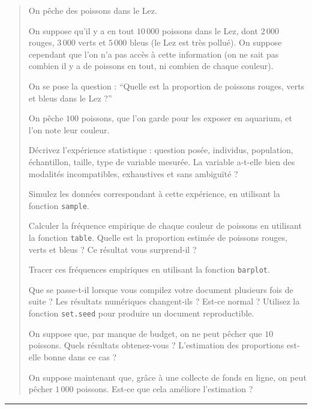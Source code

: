 \documentclass[
]{article}
\begin{document}
\begin{quote}
On pêche des poissons dans le Lez.

On suppose qu'il y a en tout \(10\,000\) poissons dans le Lez, dont
\(2\,000\) rouges, \(3\,000\) verts et \(5\,000\) bleus (le Lez est très
pollué). On suppose cependant que l'on n'a pas accès à cette information
(on ne sait pas combien il y a de poissons en tout, ni combien de chaque
couleur).

On se pose la question : ``Quelle est la proportion de poissons rouges,
verts et bleus dans le Lez ?''

On pêche \(100\) poissons, que l'on garde pour les exposer en aquarium,
et l'on note leur couleur.

Décrivez l'expérience statistique : question posée, individus,
population, échantillon, taille, type de variable mesurée. La variable
a-t-elle bien des modalités incompatibles, exhaustives et sans ambiguïté
?

Simulez les données correspondant à cette expérience, en utilisant la
fonction \texttt{sample}.

Calculer la fréquence empirique de chaque couleur de poissons en
utilisant la fonction \texttt{table}. Quelle est la proportion estimée
de poissons rouges, verts et bleus ? Ce résultat vous surprend-il ?

Tracer ces fréquences empiriques en utilisant la fonction
\texttt{barplot}.

Que se passe-t-il lorsque vous compilez votre document plusieurs fois de
suite ? Les résultats numériques changent-ils ? Est-ce normal ? Utilisez
la fonction \texttt{set.seed} pour produire un document reproductible.

On suppose que, par manque de budget, on ne peut pêcher que \(10\)
poissons. Quels résultats obtenez-vous ? L'estimation des proportions
est-elle bonne dans ce cas ?

On suppose maintenant que, grâce à une collecte de fonds en ligne, on
peut pêcher \(1\,000\) poissons. Est-ce que cela améliore l'estimation ?
\end{quote}

\begin{center}\rule{0.5\linewidth}{0.5pt}\end{center}
\end{document}
